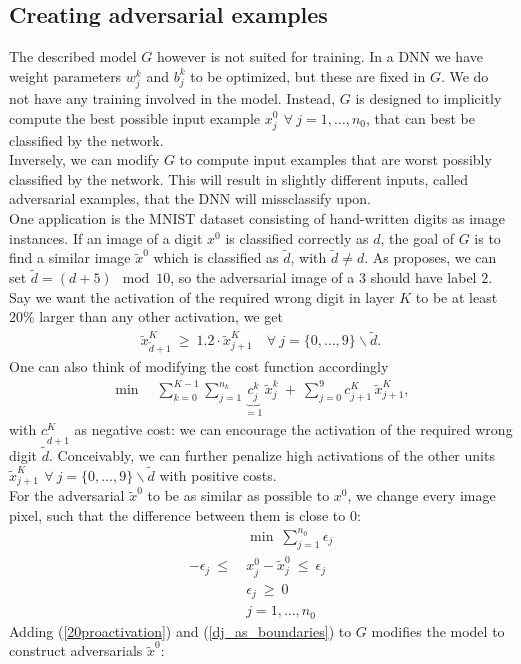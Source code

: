 \documentclass{article}
\begin{document}
\subsection{Creating adversarial examples}
\label{DNN:adversarial}
The described model $G$ however is not suited for training. In a DNN we have weight parameters $w_j^k$ and $b_j^k$ to be optimized, but these are fixed in $G$. We do not have any training involved in the model. Instead, $G$ is designed to implicitly compute the best possible input example $x_j^0 \ \, \forall \ j=1, \ldots, n_0$, that can best be classified by the network.\\
Inversely, we can modify $G$ to compute input examples that are worst possibly classified by the network. This will result in slightly different inputs, called adversarial examples, that the DNN will missclassify upon.\\
One application is the MNIST dataset consisting of hand-written digits as image instances.
If an image of a digit $x^0$ is classified correctly as $d$, the goal of $G$ is to find a similar image $\tilde{x}^0$ which is classified as $\tilde{d}$, with $\tilde{d}\neq d$. As \cite{fischetti17} proposes, we can set $\tilde{d} = (d+5) \mod 10$, so the adversarial image of a $3$ should have label $2$.\\
Say we want the activation of the required wrong digit in layer $K$ to be at least $20\%$ larger than any other activation, we get
\begin{align} \label{20proactivation}
\tilde{x}^K_{\tilde{d}+1} \ \geq \ 1.2 \cdot \tilde{x}_{j+1}^K \quad \forall \ j=\{0,\ldots ,9 \} \backslash \tilde{d}.
\end{align}
One can also think of modifying the cost function accordingly
\begin{align}
\min \quad \sum_{k=0}^{K-1} \sum_{j=1}^{n_k} \underbrace{c_j^k}_{=1} \,\tilde{x}_j^k \ + \ \sum_{j=0}^{9} c_{j+1}^K \, \tilde{x}_{j+1}^K,
\end{align}
with $c_{\tilde{d}+1}^K$ as negative cost: we can encourage the activation of the required wrong digit $\tilde{d}$. Conceivably, we can further penalize high activations of the other units $\tilde{x}_{j+1}^K \ \, \forall \ j=\{ 0, \ldots, 9 \} \backslash \tilde{d}$ with positive costs.\\
For the adversarial $\tilde{x}^0$ to be as similar as possible to $x^0$, we change every image pixel, such that the difference between them is close to $0$:
\begin{align} 
&\min \ \sum_{j=1}^{n_0} \epsilon_j \label{min_sum_dj} \\
-\epsilon_j \ \leq \ &x_j^0 - \tilde{x}_j^0 \ \leq \ \epsilon_j \\
&\epsilon_j \ \geq \ 0 \\
&j=1, \ldots, n_0 \label{dj_as_boundaries}
\end{align}
Adding (\ref{20proactivation}) and (\ref{dj_as_boundaries}) to $G$ modifies the model to construct adversarials $\tilde{x}^0$:
\end{document}
